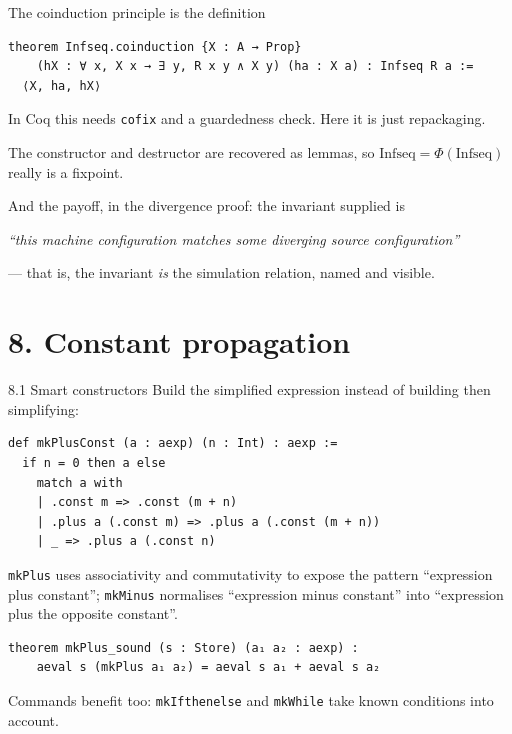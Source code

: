 \documentclass[aspectratio=169,10pt]{beamer}
\newcommand{\code}[1]{\texttt{\small #1}}
\begin{document}
\begin{frame}[fragile]{The coinduction principle is the definition}
\begin{lstlisting}
theorem Infseq.coinduction {X : A → Prop}
    (hX : ∀ x, X x → ∃ y, R x y ∧ X y) (ha : X a) : Infseq R a :=
  ⟨X, ha, hX⟩
\end{lstlisting}
In Coq this needs \code{cofix} and a guardedness check.  Here it is just
repackaging.
\medskip

The constructor and destructor are recovered as lemmas, so
$\mathrm{Infseq} = \Phi(\mathrm{Infseq})$ really is a fixpoint.
\medskip

And the payoff, in the divergence proof: the invariant supplied is
\begin{center}
\emph{``this machine configuration matches some diverging source
configuration''}
\end{center}
--- that is, the invariant \emph{is} the simulation relation, named and
visible.
\end{frame}

\section{8. Constant propagation}

\begin{frame}[fragile]{8.1 Smart constructors}
Build the simplified expression instead of building then simplifying:
\begin{lstlisting}
def mkPlusConst (a : aexp) (n : Int) : aexp :=
  if n = 0 then a else
    match a with
    | .const m => .const (m + n)
    | .plus a (.const m) => .plus a (.const (m + n))
    | _ => .plus a (.const n)
\end{lstlisting}
\code{mkPlus} uses associativity and commutativity to expose the pattern
``expression plus constant''; \code{mkMinus} normalises ``expression minus
constant'' into ``expression plus the opposite constant''.
\begin{lstlisting}
theorem mkPlus_sound (s : Store) (a₁ a₂ : aexp) :
    aeval s (mkPlus a₁ a₂) = aeval s a₁ + aeval s a₂
\end{lstlisting}
Commands benefit too: \code{mkIfthenelse} and \code{mkWhile} take known
conditions into account.
\end{frame}
\end{document}
